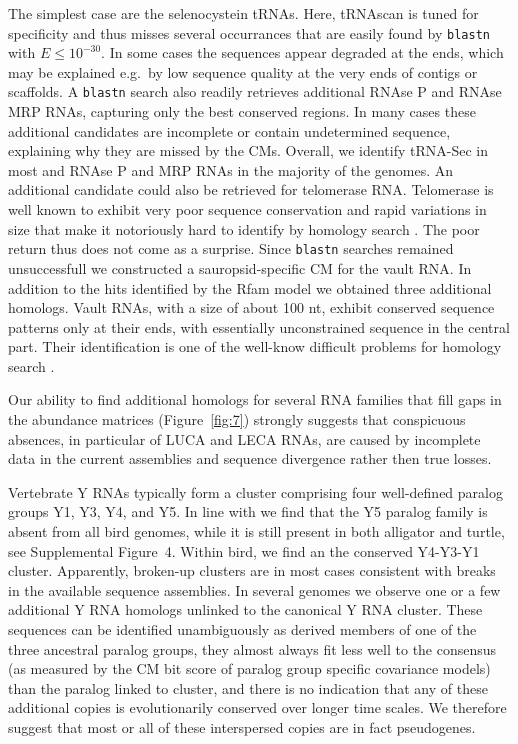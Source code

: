 \documentclass[10pt]{bmc_article}
\newenvironment{bmcformat}{\begin{raggedright}\baselineskip20pt\sloppy\setboolean{publ}{false}}{\end{raggedright}\baselineskip20pt\sloppy}
\begin{document}
\begin{bmcformat}
The simplest case are the selenocystein tRNAs. Here, tRNAscan is tuned
for specificity and thus misses several occurrances that are easily
found by \texttt{blastn} with $E\le 10^{-30}$. In some cases the
sequences appear degraded at the ends, which may be explained e.g.\ by
low sequence quality at the very ends of contigs or scaffolds. A
\texttt{blastn} search also readily retrieves additional RNAse P and
RNAse MRP RNAs, capturing only the best conserved regions. In many
cases these additional candidates are incomplete or contain
undetermined sequence, explaining why they are missed by the
CMs. Overall, we identify tRNA-Sec in most and RNAse P and MRP RNAs in
the majority of the genomes. An additional candidate could also be
retrieved for telomerase RNA. Telomerase is well known to exhibit very
poor sequence conservation and rapid variations in size that make it
notoriously hard to identify by homology search \cite{Xie:08a}. The
poor return thus does not come as a surprise. Since \texttt{blastn}
searches remained unsuccessfull we constructed a sauropsid-specific CM
for the vault RNA. In addition to the hits identified by the Rfam
model we obtained three additional homologs. Vault RNAs, with a size
of about 100 nt, exhibit conserved sequence patterns only at their
ends, with essentially unconstrained sequence in the central
part. Their identification is one of the well-know difficult problems
for homology search \cite{Stadler:09b}.

Our ability to find additional homologs for several RNA families that fill
gaps in the abundance matrices (Figure~\ref{fig:7})
strongly suggests that conspicuous absences, in particular of LUCA and
LECA RNAs, are caused by incomplete data in the current assemblies and
sequence divergence rather then true losses.


Vertebrate Y RNAs typically form a cluster comprising four
well-defined paralog groups Y1, Y3, Y4, and Y5. In line with
\cite{Mosig:07a} we find that the Y5 paralog family is absent from all
bird genomes, while it is still present in both alligator and turtle,
see Supplemental Figure~4. Within bird, we find an the conserved
Y4-Y3-Y1 cluster. Apparently, broken-up clusters are in most cases
consistent with breaks in the available sequence assemblies. In
several genomes we observe one or a few additional Y RNA homologs
unlinked to the canonical Y RNA cluster. These sequences can be
identified unambiguously as derived members of one of the three
ancestral paralog groups, they almost always fit less well to the
consensus (as measured by the CM bit score of paralog group specific
covariance models) than the paralog linked to cluster, and there is no
indication that any of these additional copies is evolutionarily
conserved over longer time scales. We therefore suggest that most or
all of these interspersed copies are in fact pseudogenes.


\end{bmcformat}
\end{document}

